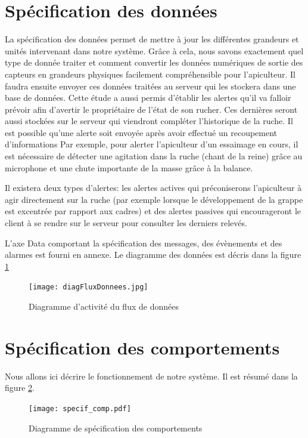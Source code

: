 \clearpage

\section{Spécification des données}

La spécification des données permet de mettre à jour les différentes grandeurs 
et unités intervenant dans notre système. Grâce à cela, nous savons exactement 
quel type de donnée traiter et comment convertir les données numériques de sortie des capteurs en grandeurs physiques facilement compréhensible pour l'apiculteur. Il faudra ensuite envoyer ces données traitées au serveur qui les stockera dans une base de données. Cette étude a aussi permis d'établir les alertes qu'il va falloir prévoir afin d'avertir le propriétaire de l'état de son rucher. Ces dernières seront aussi stockées sur le serveur qui viendront compléter l'historique de la ruche. Il est possible qu'une alerte soit envoyée après avoir effectué un recoupement d'informations Par exemple, pour alerter l'apiculteur d'un essaimage en cours, il est nécessaire de détecter une agitation dans la ruche (chant de la reine) grâce au microphone et une chute importante de la masse grâce à la balance. 

Il existera deux types d'alertes: les alertes actives qui préconiserons l'apiculteur à agir directement sur la ruche (par exemple lorsque le développement de la grappe est excentrée par rapport aux cadres) et des alertes passives qui encourageront le client à se rendre sur le serveur pour consulter les derniers relevés.   

L'axe Data comportant la spécification des messages, des évènements et des alarmes est fourni en annexe.
Le diagramme des données est décris dans la figure \ref{fig:donnees} 

\begin{figure}[h!]
\centering\texttt{[image: diagFluxDonnees.jpg]}
\caption{\label{fig:donnees} Diagramme d'activité du flux de données}
\end{figure}

\clearpage

\section{Spécification des comportements}

Nous allons ici décrire le fonctionnement de notre système. Il est résumé dans la figure \ref{fig:sp_comp}.

\begin{figure}[h!]
\centering\texttt{[image: specif\_comp.pdf]}
\caption{\label{fig:sp_comp} Diagramme de spécification des comportements}
\end{figure}

